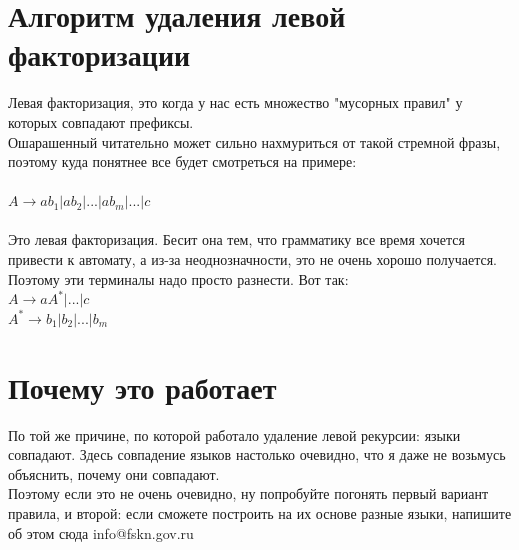 \documentclass[14pt]{extreport}
\begin{document}
	\section{Алгоритм удаления левой факторизации}
	Левая факторизация, это когда у нас есть множество "мусорных правил" у которых
	совпадают префиксы.\\
	Ошарашенный читательно может сильно нахмуриться от такой стремной фразы, поэтому
	куда понятнее все будет смотреться на примере:\\\\
	$A \to ab_1|ab_2|...|ab_m|...|c $\\\\
	Это левая факторизация. Бесит она тем, что грамматику все время хочется привести к
	автомату, а из-за неоднозначности, это не очень хорошо получается.\\
	Поэтому эти терминалы надо просто разнести. Вот так:\\
	$A \to aA^*|...|c $\\
	$A^* \to b_1|b_2|...|b_m $\\
	\section{Почему это работает}
	По той же причине, по которой работало удаление левой рекурсии: языки совпадают.
	Здесь совпадение языков настолько очевидно, что я даже не возьмусь объяснить, почему
	они совпадают.\\
	Поэтому если это не очень очевидно, ну попробуйте погонять первый вариант правила, и
	второй: если сможете построить на их основе разные языки, напишите об этом сюда
	info@fskn.gov.ru
\end{document}
